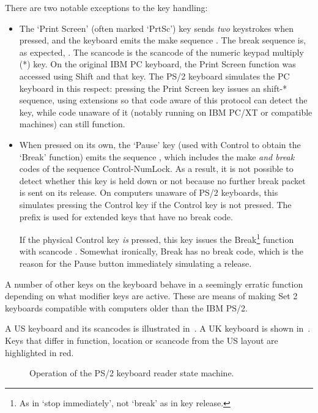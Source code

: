 There are two notable exceptions to the key handling:

\begin{itemize}
\item The ‘Print Screen’ (often marked ‘PrtSc’) key sends {\em two\/}
  keystrokes when pressed, and the keyboard emits the make sequence . The break sequence is, as expected, . The
  scancode  is the scancode of the numeric keypad multiply (\textsf{*})
  key. On the original IBM PC keyboard, the Print Screen function was accessed
  using Shift and that key. The PS/2 keyboard simulates the PC keyboard in this
  respect: pressing the Print Screen key issues an shift-\textsf{*} sequence,
  using  extensions so that code aware of this protocol can detect the
  key, while code unaware of it (notably running on IBM PC/XT or compatible
  machines) can still function.

\item When pressed on its own, the ‘Pause’ key (used with Control to
  obtain the ‘Break’ function) emits the sequence , which includes the make {\em and break\/} codes of the
  sequence \textsf{Control-NumLock}. As a result, it is not possible to detect
  whether this key is held down or not because no further break packet
  is sent on its release. On computers unaware of PS/2 keyboards, this
  simulates pressing the Control key if the Control key is not
  pressed. The prefix  is used for extended keys that have no
  break code.

  If the physical Control key {\em is\/} pressed, this key issues the
  Break\footnote{As in ‘stop immediately’, not ‘break’ as in key release.}
  function with scancode . Somewhat ironically, Break has no break
  code, which is the reason for the Pause button immediately simulating a
  release.
\end{itemize}

A number of other keys on the keyboard behave in a seemingly erratic function
depending on what modifier keys are active. These are means of making Set 2
keyboards compatible with computers older than the IBM PS/2.

A US keyboard and its scancodes is illustrated in~. A
UK keyboard is shown in~. Keys that differ in
function, location or scancode from the US layout are highlighted in
red.


\begin{figure}
  \centering
  \caption[PS/2 Set 2 State Machine
    Flowchart]{\label{fig:kbd-key-fsm-flowchart}Operation of the PS/2
    keyboard reader state machine.}
\end{figure}


